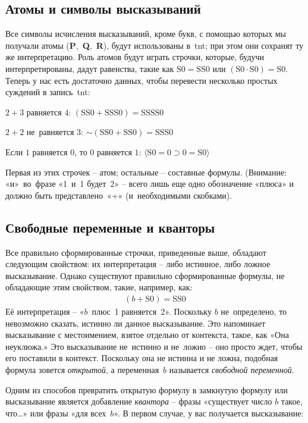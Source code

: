 \documentclass[../main.tex]{subfiles}
\begin{document}
\subsection{Атомы и символы высказываний}

Все символы исчисления высказываний, кроме букв, с помощью которых мы получали атомы (\textbf{P},~\textbf{Q},~\textbf{R}), будут использованы в~\acs{tnt}; при этом они сохранят ту же интерпретацию. Роль атомов будут играть строчки, которые, будучи интерпретированы, дадут равенства, такие как $\mathrm{S0} = \mathrm{SS0}$ или $(\mathrm{S0} \cdot \mathrm{S0}) = \mathrm{S0}$. Теперь у нас есть достаточно данных, чтобы перевести несколько простых суждений в запись~\acs{tnt}:

$2+3$ равняется $4$: $(\mathrm{SS0} + \mathrm{SSS0}) = \mathrm{SSSS0}$

$2+2$ не~равняется $3$: $\mathord{\sim} (\mathrm{SS0} + \mathrm{SS0}) = \mathrm{SSS0}$

Если $1$ равняется $0$, то $0$ равняется $1$: $\mathrm{\langle S0=0 \supset 0=S0 \rangle}$

Первая из этих строчек \--- атом; остальные \--- составные формулы. (Внимание: «и»~во~фразе «1~и~1 будет~2» \--- всего лишь еще одно обозначение «плюса» и должно быть представлено~«+» (и~необходимыми скобками).


\subsection{Свободные переменные и кванторы}

Все правильно сформированные строчки, приведенные выше, обладают следующим свойством: их интерпретация \--- либо истинное, либо ложное высказывание. Однако существуют правильно сформированные формулы, не обладающие этим свойством, такие, например, как:
\begin{gather*}
    (b+\mathrm{S0}) = \mathrm{SS0}
\end{gather*}
Её интерпретация \--- «$b$~плюс~1 равняется~2». Поскольку $b$ не~определено, то невозможно сказать, истинно ли данное высказывание. Это напоминает высказывание с местоимением, взятое отдельно от контекста, такое, как «Она неуклюжа.» Это высказывание не~истинно и не~ложно \--- оно просто ждет, чтобы его поставили в контекст. Поскольку она не истинна и не ложна, подобная формула зовется \emph{открытой}, а переменная~$b$ называется \emph{свободной переменной}.

Одним из способов превратить открытую формулу в замкнутую формулу или высказывание является добавление \emph{квантора} \--- фразы «существует число $b$ такое, что\ldots» или фразы «для всех~$b$». В первом случае, у вас получается высказывание:
\end{document}
